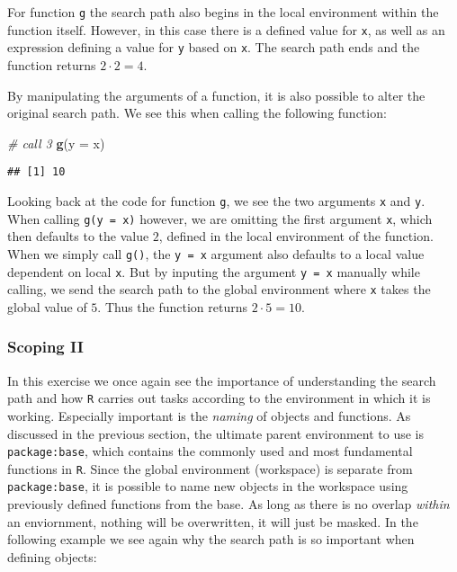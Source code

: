 \documentclass[11,]{article}
\newenvironment{Shaded}{\begin{snugshade}}{\end{snugshade}}
\newcommand{\KeywordTok}[1]{\textcolor[rgb]{0.13,0.29,0.53}{\textbf{{#1}}}}
\newcommand{\DataTypeTok}[1]{\textcolor[rgb]{0.13,0.29,0.53}{{#1}}}
\newcommand{\CommentTok}[1]{\textcolor[rgb]{0.56,0.35,0.01}{\textit{{#1}}}}
\newcommand{\NormalTok}[1]{{#1}}
\begin{document}
For function \texttt{g} the search path also begins in the local
environment within the function itself. However, in this case there is a
defined value for \texttt{x}, as well as an expression defining a value
for \texttt{y} based on \texttt{x}. The search path ends and the
function returns \(2 \cdot 2=4\).

By manipulating the arguments of a function, it is also possible to
alter the original search path. We see this when calling the following
function:

\begin{Shaded}
\begin{Highlighting}[]
\CommentTok{# call 3}
\KeywordTok{g}\NormalTok{(}\DataTypeTok{y =} \NormalTok{x)}
\end{Highlighting}
\end{Shaded}

\begin{verbatim}
## [1] 10
\end{verbatim}

Looking back at the code for function \texttt{g}, we see the two
arguments \texttt{x} and \texttt{y}. When calling \texttt{g(y = x)}
however, we are omitting the first argument \texttt{x}, which then
defaults to the value \(2\), defined in the local environment of the
function.\\When we simply call \texttt{g()}, the \texttt{y = x} argument
also defaults to a local value dependent on local \texttt{x}. But by
inputing the argument \texttt{y = x} manually while calling, we send the
search path to the global environment where \texttt{x} takes the global
value of \(5\). Thus the function returns \(2 \cdot 5=10\).

\subsubsection{Scoping II}\label{scoping-ii}

In this exercise we once again see the importance of understanding the
search path and how \texttt{R} carries out tasks according to the
environment in which it is working. Especially important is the
\emph{naming} of objects and functions. As discussed in the previous
section, the ultimate parent environment to use is
\texttt{package:base}, which contains the commonly used and most
fundamental functions in \texttt{R}. Since the global environment
(workspace) is separate from \texttt{package:base}, it is possible to
name new objects in the workspace using previously defined functions
from the base. As long as there is no overlap \emph{within} an
enviornment, nothing will be overwritten, it will just be masked. In the
following example we see again why the search path is so important when
defining objects:
\end{document}
